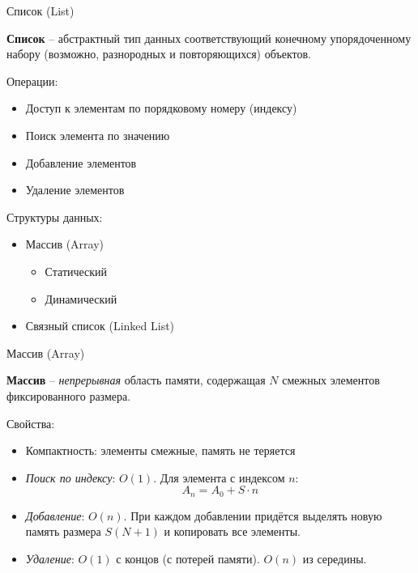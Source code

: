 
\begin{frame}{Список (List)}
  
  {\bf Список} -- абстрактный тип данных соответствующий конечному упорядоченному набору (возможно, разнородных и повторяющихся) объектов.

  Операции:
  \begin{itemize}
    \item Доступ к элементам по порядковому номеру (индексу)
    \item Поиск элемента по значению
    \item Добавление элементов
    \item Удаление элементов
  \end{itemize}

  Структуры данных:
  \begin{itemize}
    \item Массив (Array)
      \begin{itemize}
        \item Статический
        \item Динамический
      \end{itemize}
    \item Связный список (Linked List)
  \end{itemize}


\end{frame}


\begin{frame}{Массив (Array)}
  
  {\bf Массив} -- {\em непрерывная} область памяти, содержащая $N$ смежных элементов фиксированного размера.

  Свойства:
  \begin{itemize}
    \item Компактность: элементы смежные, память не теряется
    \item {\em Поиск по индексу}: $O(1)$. Для элемента с индексом $n$:
      $$A_n = A_0 + S \cdot n$$
    \item {\em Добавление}: $O(n)$. При каждом добавлении придётся выделять новую память размера
      $S(N+1)$ и копировать все элементы.
    \item {\em Удаление}: $O(1)$ с концов (с потерей памяти). $O(n)$ из середины.
  \end{itemize}

\end{frame}

